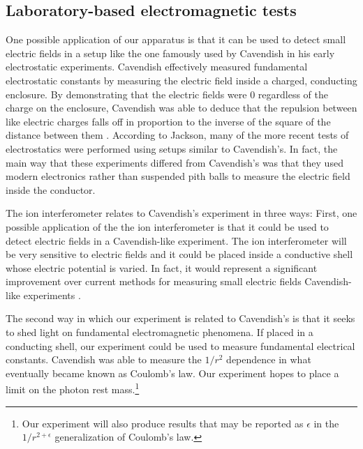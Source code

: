 \subsection{Laboratory-based electromagnetic tests}

One possible application of our apparatus is that it can be used to detect small electric fields in a setup like the one famously used by Cavendish in his early electrostatic experiments. Cavendish effectively measured fundamental electrostatic constants by measuring the electric field inside a charged, conducting enclosure. By demonstrating that the electric fields were 0 regardless of the charge on the enclosure, Cavendish was able to deduce that the repulsion between like electric charges falls off in proportion to the inverse of the square of the distance between them \cite{geodude}. According to Jackson\cite{jackson}, many of the more recent tests of electrostatics were performed using setups similar to Cavendish's. In fact, the main way that these experiments differed from Cavendish's was that they used modern electronics rather than suspended pith balls to measure the electric field inside the conductor.

The ion interferometer relates to Cavendish's experiment in three ways: First, one possible application of the the ion interferometer is that it could be used to detect electric fields in a Cavendish-like experiment. The ion interferometer will be very sensitive to electric fields and it could be placed inside a conductive shell whose electric potential is varied. In fact, it would represent a significant improvement over current methods for measuring small electric fields Cavendish-like experiments \cite{NSFprop}. 

The second way in which our experiment is related to Cavendish's is that it seeks to shed light on fundamental electromagnetic phenomena. If placed in a conducting shell, our experiment could be used to measure fundamental electrical constants. Cavendish was able to measure the $1/r^2$ dependence in what eventually became known as Coulomb's law. Our experiment hopes to place a limit on the photon rest mass.\footnote{Our experiment will also produce results that may be reported as $\epsilon$ in the $1/r^{2+\epsilon}$ generalization of Coulomb's law.}

